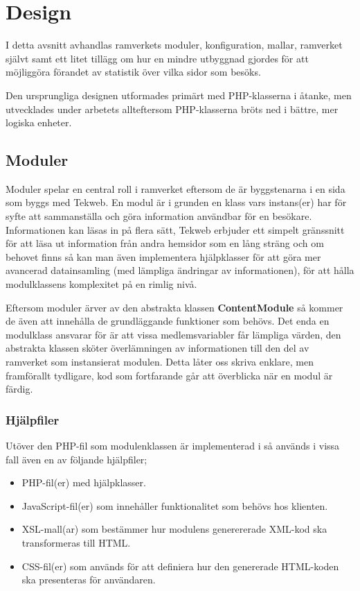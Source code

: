 \section{Design}

I detta avsnitt avhandlas ramverkets moduler, konfiguration, mallar, ramverket
självt samt ett litet tillägg om hur en mindre utbyggnad gjordes för att
möjliggöra förandet av statistik över vilka sidor som besöks.

Den ursprungliga designen utformades primärt med PHP-klasserna i åtanke,
men utvecklades under arbetets allteftersom PHP-klasserna bröts ned i bättre,
mer logiska enheter.

\subsection{Moduler}
Moduler spelar en central roll i ramverket eftersom de är byggstenarna i en sida
som byggs med Tekweb. En modul är i grunden en klass vars instans(er) har
för syfte att sammanställa och göra information användbar för en besökare.
Informationen kan läsas in på flera sätt, Tekweb erbjuder ett simpelt gränssnitt
för att läsa ut information från andra hemsidor som en lång sträng och om
behovet finns så kan man även implementera hjälpklasser för att göra mer
avancerad datainsamling (med lämpliga ändringar av informationen), för att
hålla modulklassens komplexitet på en rimlig nivå.

Eftersom moduler ärver av den abstrakta klassen {\bf ContentModule} så kommer de
även att innehålla de grundläggande funktioner som behövs. Det enda en
modulklass ansvarar för är att vissa medlemsvariabler får lämpliga värden, den
abstrakta klassen sköter överlämningen av informationen till den del av
ramverket som instansierat modulen. Detta låter oss skriva enklare, men
framförallt tydligare, kod som fortfarande går att överblicka när en modul är
färdig.

\subsubsection{Hjälpfiler}
Utöver den PHP-fil som modulenklassen är implementerad i så används i vissa fall
även en av följande hjälpfiler;

\begin{itemize}
  \item PHP-fil(er) med hjälpklasser.
  \item JavaScript-fil(er) som innehåller funktionalitet som behövs hos
    klienten.
  \item XSL-mall(ar) som bestämmer hur modulens generererade XML-kod ska
    transformeras till HTML.
  \item CSS-fil(er) som används för att definiera hur den genererade HTML-koden
    ska presenteras för användaren.
\end{itemize}

